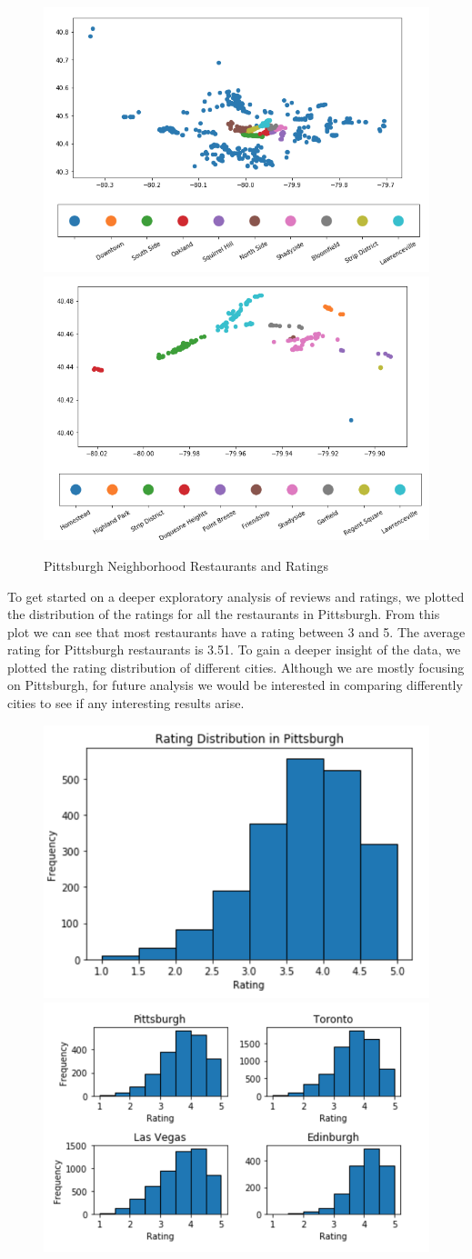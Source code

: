 \documentclass{neu_handout}
\begin{document}
\begin{figure}[h]
\centering
{
\includegraphics[width=0.4\linewidth]{pitts_hoods_most_restaurants}
}
{
\includegraphics[width=0.4\linewidth]{top_10_most_popular_neighborhoods}
}
\caption{Pittsburgh Neighborhood Restaurants and Ratings}
\end{figure}

To get started on a deeper exploratory analysis of reviews and ratings, we plotted the distribution of the ratings for all the restaurants in Pittsburgh. From this plot we can see that most restaurants have a rating between 3 and 5. The average rating for Pittsburgh restaurants is 3.51. To gain a deeper insight of the data, we plotted the rating distribution of different cities. Although we are mostly focusing on Pittsburgh, for future analysis we would be interested in comparing differently cities to see if any interesting results arise.

\begin{figure}[h]
\centering
{
\includegraphics[width=0.4\linewidth]{rating_distribution_in_Pittsburgh}
}
{
\includegraphics[width=0.4\linewidth]{rating_distribution_vs_countries}
}
\end{figure}
\end{document}
